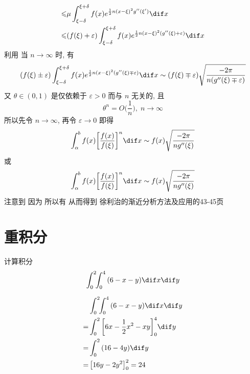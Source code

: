 \documentclass[color=green,titlestyle=hang]{elegantbook}%
\begin{document}
\begin{newproof}
\begin{align*}
\leqslant& \mu\int_{\xi-\delta}^{\xi+\delta}f(x)e^{\frac{1}{2}n(x-\xi)^2g''(\xi')}\dif x\\
\leqslant&(f(\xi)+\varepsilon)\int_{\xi-\delta}^{\xi+\delta}f(x)e^{\frac{1}{2}n(x-\xi)^2(g''(\xi)+\varepsilon)}\dif x
\end{align*}
利用  当 $n\to\infty$ 时, 有
\[(f(\xi)\pm\varepsilon)\int_{\xi-\delta}^{\xi+\delta}f(x)e^{\frac{1}{2}n(x-\xi)^2(g''(\xi)\mp\varepsilon)}\dif x\sim(f(\xi)\mp\varepsilon)\sqrt{\frac{-2\pi}{n(g''(\xi)\mp\varepsilon)}}\]
又 $\theta\in(0,1)$ 是仅依赖于 $\varepsilon>0$ 而与 $n$ 无关的, 且
\[\theta^n=O\Big(\frac{1}{n}\Big),\;n\to\infty \]
所以先令 $n\to\infty$, 再令 $\varepsilon\to0$ 即得
\[\int_{\alpha}^bf(x)\bigg[\frac{f(x)}{f(\xi)}\bigg]^n\dif x\sim f(x)\sqrt{\frac{-2\pi}{ng''(\xi)}} \]
或\[\int_{\alpha}^bf(x)\bigg[\frac{f(x)}{f(\xi)}\bigg]^n\dif x\sim f(x)\sqrt{\frac{-2\pi}{ng''(\xi)}} \]
注意到
因为  所以有
从而得到
徐利治的渐近分析方法及应用的43-45页	
\end{newproof}

\section{重积分}

\begin{exercise} 计算积分 \begin{equation*}\int_0^2\!\!{\int_0^4 {\left( {6 - x - y} \right)} } \dif x\dif y\end{equation*}\end{exercise}
\begin{Solution} 
\begin{align*}
&\int_0^2\!\!{\int_0^4 {\left( {6 - x - y} \right)} } \dif x\dif y\\
=& \int_0^2 {\left[ {6x - \frac{1}{2}{x^2} - xy} \right]_0^4} \dif y\\
= &\int_0^2 {\left( {16 - 4y} \right)} \dif y\\
= &\left[ {16y - 2{y^2}} \right]_0^2 = 24
\end{align*}	
\end{Solution}
\end{document}
